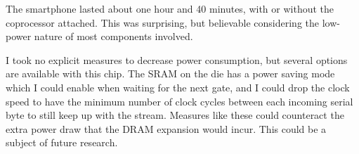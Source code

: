 The smartphone lasted about one hour and 40 minutes, with or without the coprocessor attached. This was surprising, but believable considering the low-power nature of most components involved.

I took no explicit measures to decrease power consumption, but several options are available with this chip. The SRAM on the die has a power saving mode which I could enable when waiting for the next gate, and I could drop the clock speed to have the minimum number of clock cycles between each incoming serial byte to still keep up with the stream. Measures like these could counteract the extra power draw that the DRAM expansion would incur. This could be a subject of future research.
